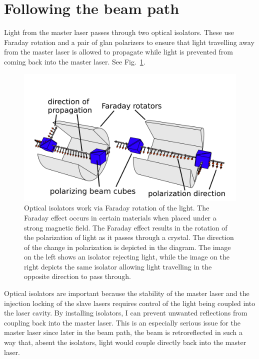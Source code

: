 \section{Following the beam path}
Light from the master laser passes through two optical isolators. These use Faraday rotation and a pair of glan polarizers to ensure that light travelling away from the master laser is allowed to propagate while light is prevented from coming back into the master laser. See Fig.~\ref{isolatorPicture}.

\begin{figure}
\centerline{\includegraphics[width=1\textwidth]{isolators}}
\caption[Optical Isolator Illustration]{\label{isolatorPicture} Optical isolators work via Faraday rotation of the light. The Faraday effect occurs in certain materials when placed under a strong magnetic field. The Faraday effect results in the rotation of the polarization of light as it passes through a crystal. The direction of the change in polarization is depicted in the diagram. The image on the left shows an isolator rejecting light, while the image on the right depicts the same isolator allowing light travelling in the opposite direction to pass through.}
\end{figure}

Optical isolators are important because the stability of the master laser and the injection locking of the slave lasers requires control of the light being coupled into the laser cavity. By installing isolators, I can prevent unwanted reflections from coupling back into the master laser. This is an especially serious issue for the master laser since later in the beam path, the beam is retroreflected in such a way that, absent the isolators, light would couple directly back into the master laser. 

